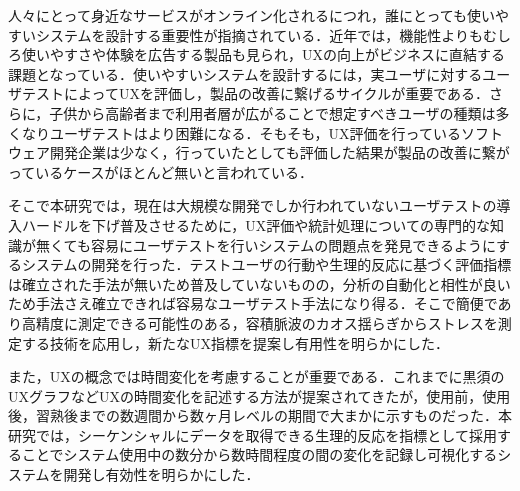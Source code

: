 
\begin{jabstract}

人々にとって身近なサービスがオンライン化されるにつれ，誰にとっても使いやすいシステムを設計する重要性が指摘されている．近年では，機能性よりもむしろ使いやすさや体験を広告する製品も見られ，UXの向上がビジネスに直結する課題となっている．使いやすいシステムを設計するには，実ユーザに対するユーザテストによってUXを評価し，製品の改善に繋げるサイクルが重要である．さらに，子供から高齢者まで利用者層が広がることで想定すべきユーザの種類は多くなりユーザテストはより困難になる．そもそも，UX評価を行っているソフトウェア開発企業は少なく，行っていたとしても評価した結果が製品の改善に繋がっているケースがほとんど無いと言われている．

そこで本研究では，現在は大規模な開発でしか行われていないユーザテストの導入ハードルを下げ普及させるために，UX評価や統計処理についての専門的な知識が無くても容易にユーザテストを行いシステムの問題点を発見できるようにするシステムの開発を行った．テストユーザの行動や生理的反応に基づく評価指標は確立された手法が無いため普及していないものの，分析の自動化と相性が良いため手法さえ確立できれば容易なユーザテスト手法になり得る．そこで簡便であり高精度に測定できる可能性のある，容積脈波のカオス揺らぎからストレスを測定する技術を応用し，新たなUX指標を提案し有用性を明らかにした．

また，UXの概念では時間変化を考慮することが重要である．これまでに黒須のUXグラフなどUXの時間変化を記述する方法が提案されてきたが，使用前，使用後，習熟後までの数週間から数ヶ月レベルの期間で大まかに示すものだった．本研究では，シーケンシャルにデータを取得できる生理的反応を指標として採用することでシステム使用中の数分から数時間程度の間の変化を記録し可視化するシステムを開発し有効性を明らかにした．

\end{jabstract}


